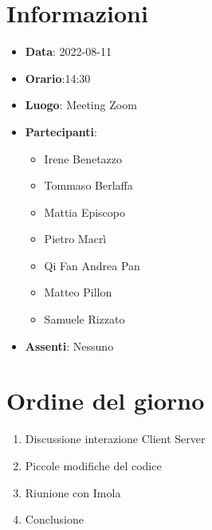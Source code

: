 \section{Informazioni}
	\begin{itemize}
		\item \textbf{Data}: 2022-08-11     %
		\item \textbf{Orario}:14:30         %
		\item \textbf{Luogo}: Meeting Zoom
		\item \textbf{Partecipanti}:
		\begin{itemize}
			\item Irene Benetazzo
			\item Tommaso Berlaffa
			\item Mattia Episcopo
			\item Pietro Macrì
			\item Qi Fan Andrea Pan
			\item Matteo Pillon
			\item Samuele Rizzato
		\end{itemize}
        \item \textbf{Assenti}: Nessuno
	\end{itemize}
    
	\section{Ordine del giorno}
	\begin{enumerate}
		\item Discussione interazione Client Server
		\item Piccole modifiche del codice
		\item Riunione con Imola
		\item Conclusione
	\end{enumerate}
	\newpage